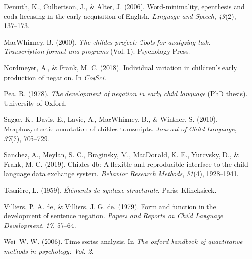 \documentclass[10pt, letterpaper]{article}
\begin{document}
\leavevmode\hypertarget{ref-demuth2006word}{}%
Demuth, K., Culbertson, J., \& Alter, J. (2006). Word-minimality,
epenthesis and coda licensing in the early acquisition of English.
\emph{Language and Speech}, \emph{49}(2), 137--173.

\leavevmode\hypertarget{ref-macwhinney2000childes}{}%
MacWhinney, B. (2000). \emph{The childes project: Tools for analyzing
talk. Transcription format and programs} (Vol. 1). Psychology Press.

\leavevmode\hypertarget{ref-nordmeyer2018individual}{}%
Nordmeyer, A., \& Frank, M. C. (2018). Individual variation in
children's early production of negation. In \emph{CogSci}.

\leavevmode\hypertarget{ref-pea1978}{}%
Pea, R. (1978). \emph{The development of negation in early child
language} (PhD thesis). University of Oxford.

\leavevmode\hypertarget{ref-sagae2010morphosyntactic}{}%
Sagae, K., Davis, E., Lavie, A., MacWhinney, B., \& Wintner, S. (2010).
Morphosyntactic annotation of childes transcripts. \emph{Journal of
Child Language}, \emph{37}(3), 705--729.

\leavevmode\hypertarget{ref-sanchez2019childes}{}%
Sanchez, A., Meylan, S. C., Braginsky, M., MacDonald, K. E., Yurovsky,
D., \& Frank, M. C. (2019). Childes-db: A flexible and reproducible
interface to the child language data exchange system. \emph{Behavior
Research Methods}, \emph{51}(4), 1928--1941.

\leavevmode\hypertarget{ref-dg}{}%
Tesnière, L. (1959). \emph{Éléments de syntaxe structurale}. Paris:
Klincksieck.

\leavevmode\hypertarget{ref-de1979form}{}%
Villiers, P. A. de, \& Villiers, J. G. de. (1979). Form and function in
the development of sentence negation. \emph{Papers and Reports on Child
Language Development}, \emph{17}, 57--64.

\leavevmode\hypertarget{ref-wei2006time}{}%
Wei, W. W. (2006). Time series analysis. In \emph{The oxford handbook of
quantitative methods in psychology: Vol. 2}.


\end{document}
